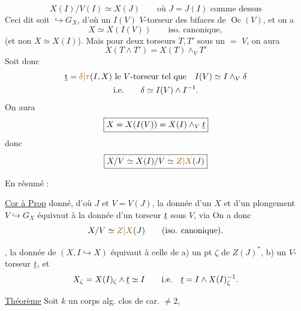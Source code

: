 \[
X(I)/V(I)\simeq X(J)\qquad\text{où }J=J(I)\text{ comme dessus}
\]
Ceci dit soit 
$\hookrightarrow G_X$, d'où un $I(V)$ $V$-torseur
des bifaces de $\operatorname{Oc}(V)$, et on a 
\[
X\simeq X(I(V))\qquad\text{iso. canonique},
\]
(et non $X\simeq X(I)$). Mais pour  deux torseurs
$T,T'$ sous un $=$ $V$, on aura
\[
X(T\wedge T')=X(T)\wedge_V T'
\]
Soit donc
\[
\begin{gathered}
\uline t=\unsure{\delta|\tau}(I,X)\text{ le }V\text{-torseur tel que}\quad I(V)\simeq I\wedge_V\delta\\
\text{i.e.}\qquad\delta\simeq I(V)\wedge I^{-1}.
\end{gathered}
\]
On aura
\[
\boxed{X=X(I(V))=X(I)\wedge_V\uline t}
\]
 donc
\[
\boxed{X/V\simeq X(I)/V\simeq\unsure{Z|X}(J)}
\]

En résumé :

\uline{Cor à Prop} 
donné, d'où $J$ et
$V=V(J)$, la donnée d'un $X$ et d'un plongement
$V\hookrightarrow G_X$ équivaut à la donnée d'un torseur $\uline t$ sous $V$,
via
On a donc
\[
X/V\simeq\unsure{Z|X}(J)\qquad\text{(iso. canonique)}.
\]

\uline{},  la donnée de $(X,I\hookrightarrow X)$ équivaut à
celle de a) un pt $\zeta$ de $Z(J)^*$, b) un $V$-torseur $\uline t$,
et
\[
X_\zeta=X(I)_\zeta\wedge\uline t\simeq I\qquad\text{i.e.}\quad\uline t=I\wedge X(I)_\zeta^{-1}.
\]

\uline{Théorème} Soit $k$ un corps alg. clos de car. $\ne2$,


